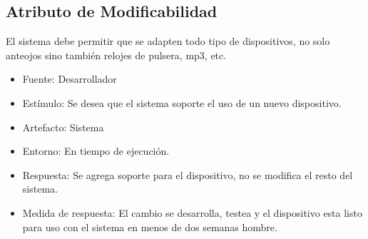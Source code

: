 \subsection{Atributo de Modificabilidad}

El sistema debe permitir que se adapten todo tipo de dispositivos, no
solo anteojos sino también relojes de pulsera, mp3, etc.

\begin{itemize}
\itemsep1pt\parskip0pt
\item
  Fuente: Desarrollador
\item
  Estímulo: Se desea que el sistema soporte el uso de un nuevo
  dispositivo.
\item
  Artefacto: Sistema
\item
  Entorno: En tiempo de ejecución.
\item
  Respuesta: Se agrega soporte para el dispositivo, no se modifica el
  resto del sistema.
\item
  Medida de respuesta: El cambio se desarrolla, testea y el dispositivo
  esta listo para uso con el sistema en menos de dos semanas hombre.
\end{itemize}
